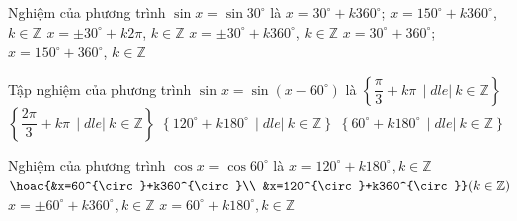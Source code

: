 \begin{ex}%
	Nghiệm của phương trình $\sin x =  \sin 30^\circ$ là
	 \choice
		{\True $x= 30^\circ +  k360^\circ$; $x = 150^\circ + k360^\circ$, $k \in \mathbb{Z}$}
		 {$x = \pm 30^\circ + k2\pi$, $k \in \mathbb{Z}$}
		{$x=\pm 30^\circ + k360^\circ$, $  k \in \mathbb{Z}$}
		{$x=30^\circ + 360^\circ$; $x=150^\circ + 360^\circ$, $k \in \mathbb{Z}$} 
\end{ex}

\begin{ex}%
	Tập nghiệm của phương trình  $\sin x=\sin(x-60^\circ)$ là
	\choice 
		{$\left\{\dfrac{\pi}{3}+k\pi\,\mid  dle|\ k\in\mathbb{Z}\right\}$}
		 {$\left\{\dfrac{2\pi}{3}+k\pi\,\mid dle|\ k\in\mathbb{Z}\right\}$}
		{\True $\left\{120^\circ+k180^\circ\,\mid dle|\  k\in\mathbb{Z}\right\}$}
		{$\left\{60^\circ+k180^\circ\,\mid  dle|\ k\in\mathbb{Z}\right\}$}
\end{ex}

\begin{ex}%
	Nghiệm của phương trình $\cos x=\cos  60^{\circ}$ là
	\choice 
		{$x=120^{\circ}+k180^{\circ}, k\in\mathbb{Z}$} 
		{$\hoac{&x=60^{\circ}+k360^{\circ}\\ 
		&x=120^{\circ}+k360^{\circ}}  (k\in\mathbb{Z})$}
		{\True $x=\pm 60^{\circ}+k360^{\circ}, k\in\mathbb{Z}$} 
		{$x=60^{\circ}+k180^{\circ}, k\in\mathbb{Z}$} 
\end{ex}

